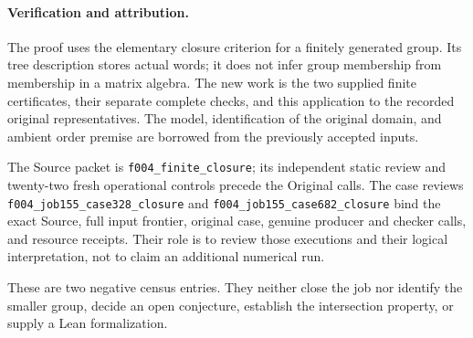 \documentclass[11pt]{article}
\begin{document}
\paragraph{Verification and attribution.}
The proof uses the elementary closure criterion for a finitely generated
group. Its tree description stores actual words; it does not infer group
membership from membership in a matrix algebra. The new work is the two
supplied finite certificates, their separate complete checks, and this
application to the recorded original representatives. The model,
identification of the original domain, and ambient order premise are
borrowed from the previously accepted inputs.

The Source packet is \texttt{f004\_finite\_closure}; its independent static
review and twenty-two fresh operational controls precede the Original
calls. The case reviews \texttt{f004\_job155\_case328\_closure} and
\texttt{f004\_job155\_case682\_closure} bind the exact Source, full input
frontier, original case, genuine producer and checker calls, and resource
receipts. Their role is to review those executions and their logical
interpretation, not to claim an additional numerical run.

These are two negative census entries. They neither close the job nor
identify the smaller group, decide an open conjecture, establish the
intersection property, or supply a Lean formalization.
\end{document}
